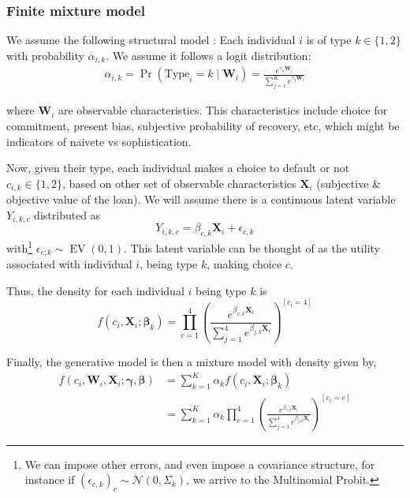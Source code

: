 \subsubsection{Finite mixture model }\label{fmm_section}

\vspace{.2in}
\normalsize
\linespread{1.25}

We assume the following structural model : Each individual $i$ is of type  $k\in\{1, 2\}$ with probability $\alpha_{i,k}$. We assume it follows a logit distribution:
\begin{align*}
\label{dist_alpha}
    \alpha_{i,k} = \Pr(\text{Type}_i = k \;|\; \mathbf{W}_{i}) = \frac{e^{\gamma_{k}\mathbf{W}_i}}{\sum_{j=1}^{K} e^{\gamma_{j}\mathbf{W}_i}}
\end{align*}

where $\mathbf{W}_i$ are observable characteristics. This characteristics include choice for commitment, present bias, subjective probability of recovery, etc, which might be indicators of naivete vs sophistication.  

Now, given their type, each individual makes a choice to default or not $c_{i,k} \in \{1,2\}$, based on other set of observable characteristics $\mathbf{X}_i$ (subjective \& objective value of the loan). We will assume there is a continuous latent variable $Y_{i,k,c}$ distributed as
\[Y_{i,k,c} = \beta_{c,k}\mathbf{X}_{i} +\epsilon_{c,k}\]
with\footnote{We can impose other errors, and even impose a covariance structure, for instance if $(\epsilon_{c,k})_{c}\sim\mathcal{N}(0,\Sigma_k)$, we arrive to the Multinomial Probit.} $\epsilon_{c;k}\sim\operatorname{EV}(0,1)$. This latent variable can be thought of as the utility associated with individual $i$, being type $k$, making choice $c$. 



Thus, the density for each individual $i$ being type $k$ is
\[f(c_i,\mathbf{X}_i; \bm\beta_{k}) = \prod_{c=1}^4\left(\frac{e^{\beta_{c,k} \mathbf{X}_i}}{\sum_{j=1}^{4} e^{\beta_{j,k}  \mathbf{X}_i}}\right)^{[c_i=4]}\]

Finally, the generative model is then a mixture model with density given by,
\begin{align*}
    f(c_i ,\mathbf{W}_i, \mathbf{X}_i; \bm{\gamma},\bm{\beta}) &= \sum_{k=1}^K \alpha_k f(c_i,\mathbf{X}_i; \bm\beta_{k}) \\
    &= \sum_{k=1}^K \alpha_k \prod_{c=1}^4\left(\frac{e^{\beta_{c,k} \mathbf{X}_i}}{\sum_{j=1}^{4} e^{\beta_{j,k}  \mathbf{X}_i}}\right)^{[c_i=c]} 
\end{align*}



